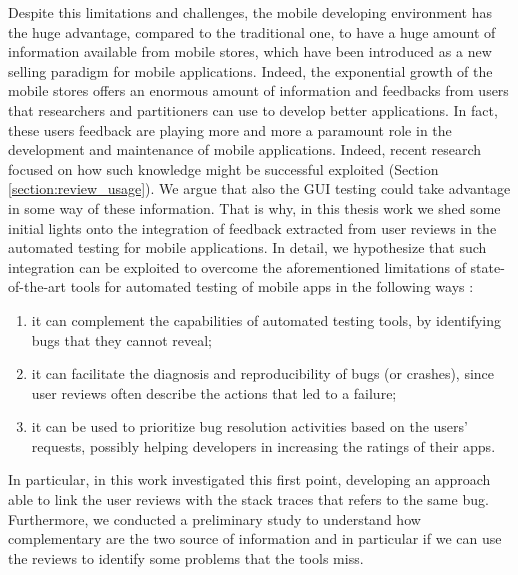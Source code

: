 Despite this limitations and challenges, the mobile developing environment has the huge advantage, compared to the traditional one, to have a huge amount of information available from mobile stores, which have been introduced as a new selling paradigm for mobile applications. Indeed, the exponential growth of the mobile stores offers an enormous amount of information and feedbacks from users that researchers and partitioners can use to develop better applications. In fact, these users feedback are playing more and more a paramount role in the development and maintenance of mobile applications. Indeed, recent research focused on how such knowledge might be successful exploited (Section \ref{section:review_usage}). 
We argue that also the GUI testing could take advantage in some way of these information. That is why, in this thesis work we shed some initial lights onto the integration of feedback extracted from user reviews in the automated testing for mobile applications.
In detail, we hypothesize that such integration can be exploited to overcome the aforementioned limitations of state-of-the-art tools for automated testing of mobile apps in the following ways \cite{cristal}: 
\begin{enumerate}
\item it can complement the capabilities of automated testing tools, by identifying bugs that they cannot reveal; 
\item it can facilitate the diagnosis and reproducibility of bugs (or crashes), since user reviews often describe the actions that led to a failure; 
\item it can be used to prioritize bug resolution activities based on the users' requests, possibly helping developers in increasing the ratings of their apps.
\end{enumerate} 
In particular, in this work investigated this first point, developing an approach able to link the user reviews with the stack traces that refers to the same bug. Furthermore, we conducted a preliminary study to understand how complementary are the two source of information and in particular if we can use the reviews to identify some problems that the tools miss. 

